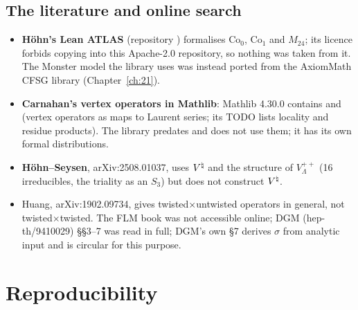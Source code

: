 \subsection{The literature and online search}
\begin{itemize}
\item \textbf{H\"ohn's Lean ATLAS} (repository ) formalises
  $\mathrm{Co}_0$, $\mathrm{Co}_1$ and $M_{24}$; its licence forbids copying
  into this Apache-2.0 repository, so nothing was taken from it. The Monster model the library uses was
  instead ported from the AxiomMath CFSG library (Chapter~\ref{ch:21}).
\item \textbf{Carnahan's vertex operators in Mathlib}: Mathlib 4.30.0 contains
   and  (vertex
  operators as maps to Laurent series; its TODO lists locality and residue products). The library
  predates and does not use them; it has its own formal distributions.
\item \textbf{H\"ohn--Seysen}, arXiv:2508.01037, uses ${V^{\natural}}$ and the structure of $V_\Lambda^{++}$
  (16 irreducibles, the triality as an $S_3$) but does not construct ${V^{\natural}}$.
\item Huang, arXiv:1902.09734, gives twisted$\times$untwisted operators in general, not
  twisted$\times$twisted. The FLM book was not accessible online; DGM (hep-th/9410029) \S\S3--7 was
  read in full; DGM's own \S7 derives $\sigma$ from analytic input and is circular for this purpose.
\end{itemize}

\section{Reproducibility}\label{ch15:sec:repro}

